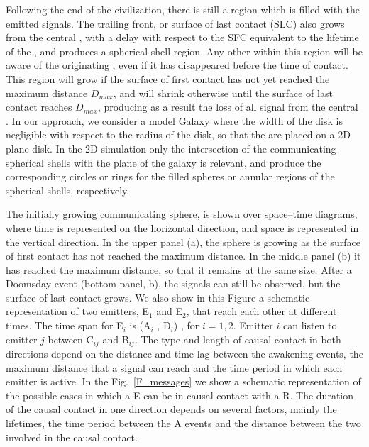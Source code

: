 Following the end of the civilization, there is still a region which
is filled with the emitted signals.
%
The trailing front, or surface of last contact (SLC) also grows from
the central \ceti{}, with a delay with respect to the SFC equivalent to
the lifetime of the \ceti{}, and produces a spherical shell region.
%
Any other \ceti{} within this region will be aware of the originating
\ceti{},
even if it has disappeared before the time of contact.
%
This region will grow if the surface of first contact has not yet
reached the maximum distance $D_{max}$, and will shrink otherwise
until the surface of last contact reaches $D_{max}$, producing as a
result the loss of all signal from the central \ceti{}.
%
In our approach, we consider a model Galaxy where the width of the
disk is negligible with respect to the radius of the disk, so that the
\cetis{} are placed on a 2D plane disk.
%
In the 2D simulation only the intersection of the communicating
spherical shells with the plane of the galaxy is relevant, and produce
the corresponding circles or rings for the filled spheres or annular
regions of the spherical shells, respectively.

  


The initially growing communicating sphere, is shown over
space--time diagrams, where time is represented on the horizontal
direction, and space is represented in the vertical direction.
%
In the upper panel (a), the sphere is growing as the surface of first
contact has not reached the maximum distance.
%
In the middle panel (b) it has reached the maximum distance, so that
it remains at the same size.
%
After a Doomsday event (bottom panel, b), the signals can still be
observed, but the surface of last contact grows.
%
We also show in this Figure a schematic representation of two
emitters, E$_1$ and E$_2$, that reach each other at different times.
%
The time span for E$_i$ is (A$_i$ , D$_i$) , for $i = {1, 2}$.
%
Emitter $i$ can listen to emitter $j$ between C$_{ij}$ and B$_{ij}$.
%
The type and length of causal contact in both directions depend on the
distance and time lag between the awakening events, the maximum
distance that a signal can reach and the time period in which each
emitter is active.
%
%
In the Fig.~\ref{F_messages} we show a schematic representation of the
possible cases in which a \ceti{} E can be in causal contact with a
\ceti{}
R.
%
The duration of the causal contact in one direction depends on several
factors, mainly the lifetimes, the time period between the A events 
and the distance between the two \cetis{} involved in the causal
contact.



